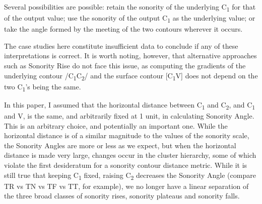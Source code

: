 \documentclass[12pt]{article}
\begin{document}
Several possibilities are possible: retain the sonority of the underlying C\textsubscript{1} for that of the output value; use the sonority of the output C\textsubscript{1} as the underlying value; or take the angle formed by the meeting of the two contours wherever it occurs. 

\begin{center}
\end{center}

The case studies here constitute insufficient data to conclude if any of these interpretations is correct. It is worth noting, however, that alternative approaches such as {\sc Sonority Rise} do not face this issue, as computing the gradients of the underlying contour /C\textsubscript{1}C\textsubscript{2}/ and the surface contour [C\textsubscript{1}V] does not depend on the two C\textsubscript{1}'s being the same.

\bigskip

 In this paper, I assumed that the horizontal distance between C\textsubscript{1} and C\textsubscript{2}, and C\textsubscript{1} and V, is the same, and arbitrarily fixed at 1 unit, in calculating {\sc Sonority Angle}. This is an arbitrary choice, and potentially an important one. While the horizontal distance is of a similar magnitude to the values of the sonority scale, the {\sc Sonority Angles} are more or less as we expect, but when the horizontal distance is made very large, changes occur in the cluster hierarchy, some of which violate the first desideratum for a sonority contour distance metric. While it is still true that keeping C\textsubscript{1} fixed, raising C\textsubscript{2} decreases the {\sc Sonority Angle} (compare TR vs TN vs TF vs TT, for example), we no longer have a linear separation of the three broad classes of sonority rises, sonority plateaus and sonority falls.
\end{document}
